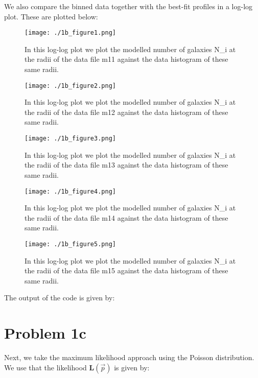 We also compare the binned data together with the best-fit profiles in a log-log plot. These are plotted below:

\begin{figure}[h!]
  \centering
  \texttt{[image: ./1b\_figure1.png]}
  \caption{In this log-log plot we plot the modelled number of galaxies N_i at the radii of the data file m11 against the data histogram of these same radii.}
\end{figure}

\begin{figure}[h!]
  \centering
  \texttt{[image: ./1b\_figure2.png]}
  \caption{In this log-log plot we plot the modelled number of galaxies N_i at the radii of the data file m12 against the data histogram of these same radii.}
\end{figure}

\begin{figure}[h!]
  \centering
  \texttt{[image: ./1b\_figure3.png]}
  \caption{In this log-log plot we plot the modelled number of galaxies N_i at the radii of the data file m13 against the data histogram of these same radii.}
\end{figure}

\begin{figure}[h!]
  \centering
  \texttt{[image: ./1b\_figure4.png]}
  \caption{In this log-log plot we plot the modelled number of galaxies N_i at the radii of the data file m14 against the data histogram of these same radii.}
\end{figure}

\begin{figure}[h!]
  \centering
  \texttt{[image: ./1b\_figure5.png]}
  \caption{In this log-log plot we plot the modelled number of galaxies N_i at the radii of the data file m15 against the data histogram of these same radii.}
\end{figure}


The output of the code is given by:



\section*{Problem 1c}

Next, we take the maximum likelihood approach using the Poisson distribution. We use that the likelihood $\textbf{L}(\vec{p})$ is given by:

